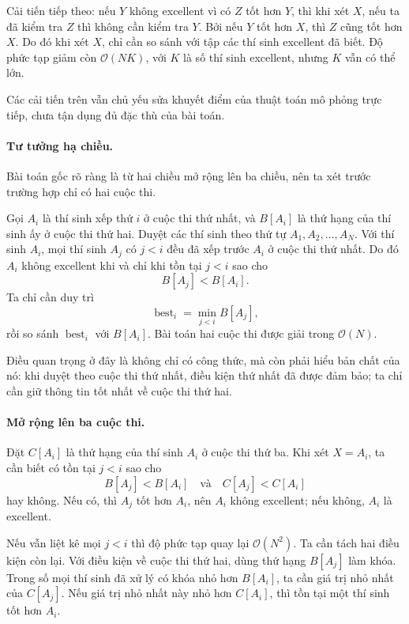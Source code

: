 \documentclass[11pt]{article}
\newcommand{\Oh}{\mathcal{O}}
\begin{document}
Cải tiến tiếp theo: nếu $Y$ không excellent vì có $Z$ tốt hơn $Y$, thì khi
xét $X$, nếu ta đã kiểm tra $Z$ thì không cần kiểm tra $Y$. Bởi nếu $Y$ tốt
hơn $X$, thì $Z$ cũng tốt hơn $X$. Do đó khi xét $X$, chỉ cần so sánh với tập
các thí sinh excellent đã biết. Độ phức tạp giảm còn $\Oh(NK)$, với $K$ là số
thí sinh excellent, nhưng $K$ vẫn có thể lớn.

Các cải tiến trên vẫn chủ yếu sửa khuyết điểm của thuật toán mô phỏng trực
tiếp, chưa tận dụng đủ đặc thù của bài toán.

\paragraph{Tư tưởng hạ chiều.}
Bài toán gốc rõ ràng là từ hai chiều mở rộng lên ba chiều, nên ta xét trước
trường hợp chỉ có hai cuộc thi.

Gọi $A_i$ là thí sinh xếp thứ $i$ ở cuộc thi thứ nhất, và $B[A_i]$ là thứ
hạng của thí sinh ấy ở cuộc thi thứ hai. Duyệt các thí sinh theo thứ tự
$A_1,A_2,\ldots,A_N$. Với thí sinh $A_i$, mọi thí sinh $A_j$ có $j<i$ đều đã
xếp trước $A_i$ ở cuộc thi thứ nhất. Do đó $A_i$ không excellent khi và chỉ
khi tồn tại $j<i$ sao cho
\[
  B[A_j]<B[A_i].
\]
Ta chỉ cần duy trì
\[
  \operatorname{best}_i=\min_{j<i} B[A_j],
\]
rồi so sánh $\operatorname{best}_i$ với $B[A_i]$. Bài toán hai cuộc thi được
giải trong $\Oh(N)$.

Điều quan trọng ở đây là không chỉ có công thức, mà còn phải hiểu bản chất của
nó: khi duyệt theo cuộc thi thứ nhất, điều kiện thứ nhất đã được đảm bảo; ta
chỉ cần giữ thông tin tốt nhất về cuộc thi thứ hai.

\paragraph{Mở rộng lên ba cuộc thi.}
Đặt $C[A_i]$ là thứ hạng của thí sinh $A_i$ ở cuộc thi thứ ba. Khi xét
$X=A_i$, ta cần biết có tồn tại $j<i$ sao cho
\[
  B[A_j]<B[A_i]\quad\text{và}\quad C[A_j]<C[A_i]
\]
hay không. Nếu có, thì $A_j$ tốt hơn $A_i$, nên $A_i$ không excellent; nếu
không, $A_i$ là excellent.

Nếu vẫn liệt kê mọi $j<i$ thì độ phức tạp quay lại $\Oh(N^2)$. Ta cần tách
hai điều kiện còn lại. Với điều kiện về cuộc thi thứ hai, dùng thứ hạng
$B[A_j]$ làm khóa. Trong số mọi thí sinh đã xử lý có khóa nhỏ hơn $B[A_i]$,
ta cần giá trị nhỏ nhất của $C[A_j]$. Nếu giá trị nhỏ nhất này nhỏ hơn
$C[A_i]$, thì tồn tại một thí sinh tốt hơn $A_i$.
\end{document}
